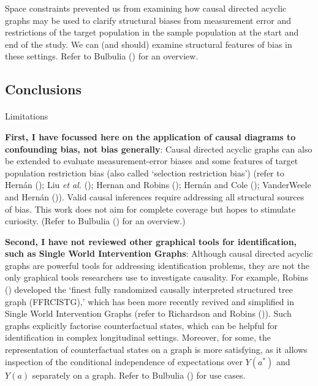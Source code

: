 \documentclass[
  single column]{article}
\makeatletter
\let\oldparagraph\paragraph
\renewcommand{\paragraph}{
    \@ifstar
      \xxxParagraphStar
      \xxxParagraphNoStar
  }
\newcommand{\xxxParagraphStar}[1]{\oldparagraph*{#1}\mbox{}}
\newcommand{\xxxParagraphNoStar}[1]{\oldparagraph{#1}\mbox{}}
\makeatother
\begin{document}
\begin{enumerate}
  Space constraints prevented us from examining how causal directed
  acyclic graphs may be used to clarify structural biases from
  measurement error and restrictions of the target population in the
  sample population at the start and end of the study. We can (and
  should) examine structural features of bias in these settings. Refer
  to Bulbulia () for an overview.
\end{enumerate}

\subsection{Conclusions}\label{id-sec-6}

\paragraph{Limitations}\label{limitations}

\textbf{First, I have focussed here on the application of causal
diagrams to confounding bias, not bias generally}: Causal directed
acyclic graphs can also be extended to evaluate measurement-error biases
and some features of target population restriction bias (also called
`selection restriction bias') (refer to Hernán
(); Liu \emph{et
al.} (); Hernan and Robins
(); Hernán and Cole
(); VanderWeele and Hernán
()). Valid causal
inferences require addressing all structural sources of bias. This work
does not aim for complete coverage but hopes to stimulate curiosity.
(Refer to Bulbulia () for an
overview.)

\textbf{Second, I have not reviewed other graphical tools for
identification, such as Single World Intervention Graphs}: Although
causal directed acyclic graphs are powerful tools for addressing
identification problems, they are not the only graphical tools
researchers use to investigate causality. For example, Robins
() developed the `finest fully randomized
causally interpreted structured tree graph (FFRCISTG),' which has been
more recently revived and simplified in Single World Intervention Graphs
(refer to Richardson and Robins
()). Such graphs
explicitly factorise counterfactual states, which can be helpful for
identification in complex longitudinal settings. Moreover, for some, the
representation of counterfactual states on a graph is more satisfying,
as it allows inspection of the conditional independence of expectations
over \(Y(a^*)\) and \(Y(a)\) separately on a graph. Refer to Bulbulia
() for use cases.
\end{document}
